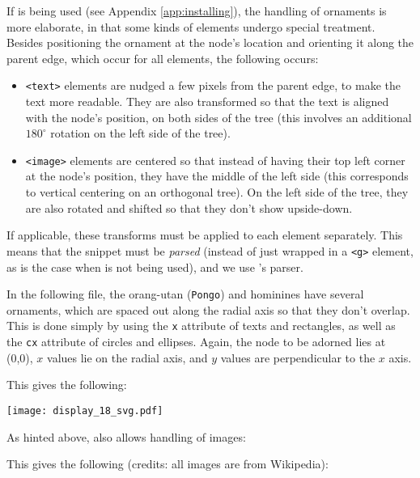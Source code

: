 If \libxml{} is being used (see Appendix \ref{app:installing}), the handling of ornaments is more elaborate, in that some kinds of elements undergo special treatment. Besides positioning the ornament at the node's location and orienting it along the parent edge, which occur for all elements, the following occurs:
\begin{itemize}
	\item \texttt{<text>} elements are nudged a few pixels from the parent edge,
	to make the text more readable. They are also transformed so that the text
	is aligned with the node's position, on both sides of the tree (this
	involves an additional $180^{\circ}$  rotation on the left side of the
	tree).
	\item \texttt{<image>} elements are centered so that instead of having
	their top left corner at the node's position, they have the middle of the
	left side (this corresponds to vertical centering on an orthogonal tree).
	On the left side of the tree, they are also rotated and shifted so that
	they don't show upside-down.
\end{itemize}

If applicable, these transforms must be applied to each element separately.
This means that the \svg{} snippet must be \emph{parsed} (instead of just
wrapped in a \texttt{<g>} element, as is the case when \libxml{} is not being
used), and we use \libxml's \xml{} parser. 

In the following file, the orang-utan (\texttt{Pongo}) and hominines have
several ornaments, which are spaced out along the radial axis so that they don't
overlap. This is done simply by using the \texttt{x} attribute of texts and
rectangles, as well as the \texttt{cx} attribute of circles and ellipses. Again,
the node to be adorned lies at (0,0), $x$ values lie on the radial axis, and $y$
values are perpendicular to the $x$ axis.



This gives the following:


\begin{center}
\texttt{[image: display\_18\_svg.pdf]}
\end{center}

As hinted above, \libxml{} also allows handling of images:



This gives the following (credits: all images are from Wikipedia):

